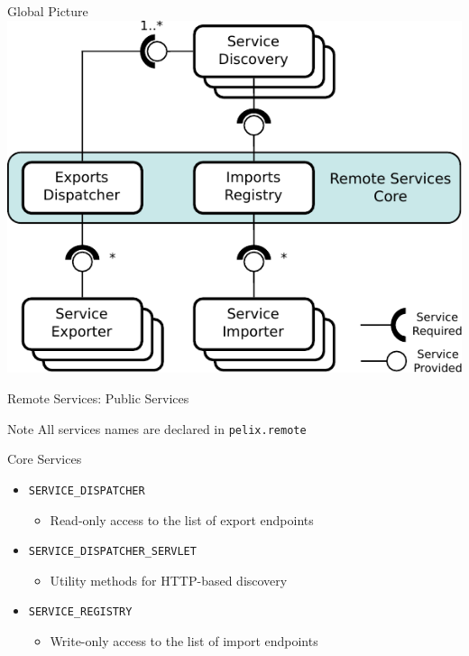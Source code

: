 \begin{frame}{Global Picture}
\centering
\includegraphics[height=.8\textheight]{../imgs/rs_arch}
\end{frame}

\begin{frame}{Remote Services: Public Services}
\begin{small}
\begin{exampleblock}{Note}
All services names are declared in \texttt{pelix.remote}
\end{exampleblock}

\begin{block}{Core Services}
\begin{itemize}
\item[] \texttt{SERVICE\_DISPATCHER}
\begin{itemize}
\vspace{-.5em}
\item[] Read-only access to the list of export endpoints
\end{itemize}
\item[] \texttt{SERVICE\_DISPATCHER\_SERVLET}
\begin{itemize}
\vspace{-.5em}
\item[] Utility methods for HTTP-based discovery
\end{itemize}
\item[] \texttt{SERVICE\_REGISTRY}
\begin{itemize}
\vspace{-.5em}
\item[] Write-only access to the list of import endpoints
\end{itemize}
\end{itemize}
\end{block}
\end{small}
\end{frame}

